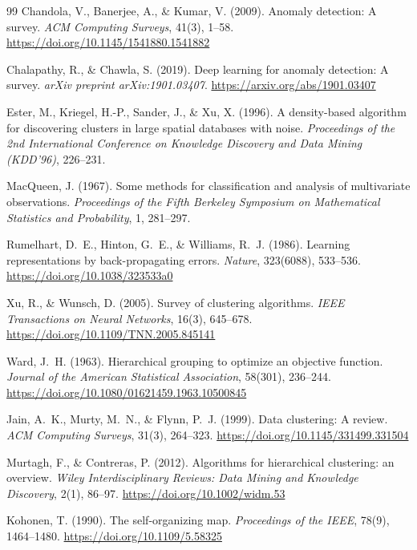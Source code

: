 \documentclass[11pt,a4paper]{article}
\theoremstyle{definition}
\theoremstyle{plain}
\theoremstyle{remark}
\begin{document}
\begin{thebibliography}{99}
Chandola, V., Banerjee, A., \& Kumar, V. (2009).
Anomaly detection: A survey.
\emph{ACM Computing Surveys}, 41(3), 1--58.
\url{https://doi.org/10.1145/1541880.1541882}

Chalapathy, R., \& Chawla, S. (2019).
Deep learning for anomaly detection: A survey.
\emph{arXiv preprint arXiv:1901.03407}.
\url{https://arxiv.org/abs/1901.03407}

Ester, M., Kriegel, H.-P., Sander, J., \& Xu, X. (1996).
A density-based algorithm for discovering clusters in large spatial databases with noise.
\emph{Proceedings of the 2nd International Conference on Knowledge Discovery and Data Mining (KDD'96)}, 226--231.

MacQueen, J. (1967).
Some methods for classification and analysis of multivariate observations.
\emph{Proceedings of the Fifth Berkeley Symposium on Mathematical Statistics and Probability}, 1, 281--297.

Rumelhart, D.~E., Hinton, G.~E., \& Williams, R.~J. (1986).
Learning representations by back-propagating errors.
\emph{Nature}, 323(6088), 533--536.
\url{https://doi.org/10.1038/323533a0}

Xu, R., \& Wunsch, D. (2005).
Survey of clustering algorithms.
\emph{IEEE Transactions on Neural Networks}, 16(3), 645--678.
\url{https://doi.org/10.1109/TNN.2005.845141}


Ward, J.~H. (1963).
Hierarchical grouping to optimize an objective function.
\emph{Journal of the American Statistical Association}, 58(301), 236--244.
\url{https://doi.org/10.1080/01621459.1963.10500845}

Jain, A.~K., Murty, M.~N., \& Flynn, P.~J. (1999).
Data clustering: A review.
\emph{ACM Computing Surveys}, 31(3), 264--323.
\url{https://doi.org/10.1145/331499.331504}

Murtagh, F., \& Contreras, P. (2012).
Algorithms for hierarchical clustering: an overview.
\emph{Wiley Interdisciplinary Reviews: Data Mining and Knowledge Discovery}, 2(1), 86--97.
\url{https://doi.org/10.1002/widm.53}

Kohonen, T. (1990).
The self-organizing map.
\emph{Proceedings of the IEEE}, 78(9), 1464--1480.
\url{https://doi.org/10.1109/5.58325}


\end{thebibliography}
\end{document}
